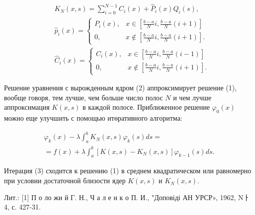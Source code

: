 \documentclass[10pt]{article}
\begin{document}
\[

\begin{aligned}

& K_{N}(x, s)=\sum_{i=0}^{N-1} \hat{C}_{i}(x)+\hat{P}_{i}(x) Q_{i}(s), \\

& \hat{p}_{i}(x)= \begin{cases}P_{i}(x), & x \in\left[\frac{b-a}{N} i, \frac{b-a}{N}(i+1)\right] \\

0, & x \notin\left[\frac{b-a}{N} i, \frac{b-a}{N}(i+1)\right] .\end{cases} \\

& \hat{C}_{i}(x)= \begin{cases}C_{i}(x), & x \in\left[\frac{b-a}{N} i, \frac{b-a}{N}(i-1)\right] \\

0, & x \notin\left[\frac{b-a}{N} i, \frac{b-a}{N}(i+1)\right] .\end{cases}

\end{aligned}

\]



Решение уравнения с вырожденным ядром (2) аппроксимирует решение (1), вообще говоря, тем лучше, чем больше число полос $N$ и чем лучше аппроксимация $K(x, s)$ в каждой полосе. Приближенное решение $\varphi_{0}(x)$ можно еще улучшить с помощью итөративного алгоритма:



\[

\begin{gathered}

\varphi_{k}(x)-\lambda \int_{a}^{b} K_{N}(x, s) \varphi_{k}(s) d s= \\

=f(x)+\lambda \int_{a}^{b}\left[K(x, s)-K_{N}(x, s)\right] \varphi_{k-1}(s) d s .

\end{gathered}

\]



Итерация (3) сходится к решению (1) в среднем квадратическом или равномерно при условии достаточной близости ядер $K(x, s)$ и $K_{N}(x, s)$.



Лит.: [1] П о ло жи й Г. Н., Ч а л е н к о П. И., "Доповіді АН УРСР», 1962, Nㅏ 4, с. 427-31.
\end{document}
